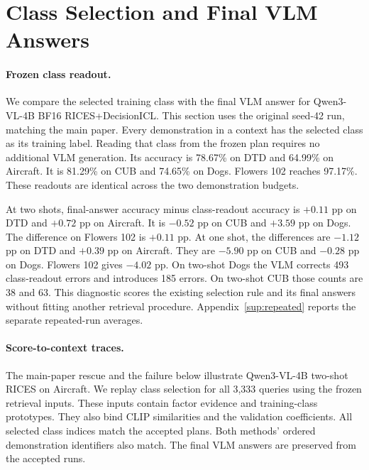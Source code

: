 \documentclass[10pt,twocolumn,letterpaper]{article}
\begin{document}
\section{Class Selection and Final VLM Answers}
\label{sup:traces}
\paragraph{Frozen class readout.}
We compare the selected training class with the final VLM answer for Qwen3-VL-4B BF16 RICES+DecisionICL. This section uses the original seed-42 run, matching the main paper. Every demonstration in a context has the selected class as its training label. Reading that class from the frozen plan requires no additional VLM generation. Its accuracy is 78.67\% on DTD and 64.99\% on Aircraft. It is 81.29\% on CUB and 74.65\% on Dogs. Flowers 102 reaches 97.17\%. These readouts are identical across the two demonstration budgets.

At two shots, final-answer accuracy minus class-readout accuracy is $+0.11$ pp on DTD and $+0.72$ pp on Aircraft. It is $-0.52$ pp on CUB and $+3.59$ pp on Dogs. The difference on Flowers 102 is $+0.11$ pp. At one shot, the differences are $-1.12$ pp on DTD and $+0.39$ pp on Aircraft. They are $-5.90$ pp on CUB and $-0.28$ pp on Dogs. Flowers 102 gives $-4.02$ pp. On two-shot Dogs the VLM corrects 493 class-readout errors and introduces 185 errors. On two-shot CUB those counts are 38 and 63. This diagnostic scores the existing selection rule and its final answers without fitting another retrieval procedure. Appendix~\ref{sup:repeated} reports the separate repeated-run averages.

\paragraph{Score-to-context traces.}
The main-paper rescue and the failure below illustrate Qwen3-VL-4B two-shot RICES on Aircraft. We replay class selection for all 3,333 queries using the frozen retrieval inputs. These inputs contain factor evidence and training-class prototypes. They also bind CLIP similarities and the validation coefficients. All selected class indices match the accepted plans. Both methods' ordered demonstration identifiers also match. The final VLM answers are preserved from the accepted runs.
\end{document}
